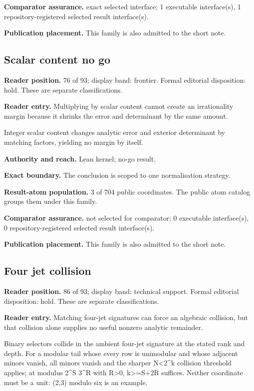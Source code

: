 \documentclass[11pt]{article}
\begin{document}
\textbf{Comparator assurance.} exact selected interface; 1 executable interface(s), 1 repository-registered selected result interface(s).

\textbf{Publication placement.} This family is also admitted to the short note.

\subsection{Scalar content no go}
\textbf{Reader position.} 76 of 93; display band: frontier.  Formal editorial disposition: hold.  These are separate classifications.

\textbf{Reader entry.} Multiplying by scalar content cannot create an irrationality margin because it shrinks the error and determinant by the same amount.

Integer scalar content changes analytic error and exterior determinant by matching factors, yielding no margin by itself.

\textbf{Authority and reach.} Lean kernel; no-go result.

\textbf{Exact boundary.} The conclusion is scoped to one normalisation strategy.

\textbf{Result-atom population.} 3 of 704 public coordinates. The public atom catalog groups them under this family.

\textbf{Comparator assurance.} not selected for comparator; 0 executable interface(s), 0 repository-registered selected result interface(s).

\textbf{Publication placement.} This family is also admitted to the short note.

\subsection{Four jet collision}
\textbf{Reader position.} 86 of 93; display band: technical support.  Formal editorial disposition: hold.  These are separate classifications.

\textbf{Reader entry.} Matching four-jet signatures can force an algebraic collision, but that collision alone supplies no useful nonzero analytic remainder.

Binary selectors collide in the ambient four-jet signature at the stated rank and depth. For a modular tail whose every row is unimodular and whose adjacent minors vanish, all minors vanish and the sharper N<2\textasciicircum{}k collision threshold applies; at modulus 2\textasciicircum{}S 3\textasciicircum{}R with R>0, k>=S+2R suffices. Neither coordinate must be a unit: (2,3) modulo six is an example.
\end{document}
